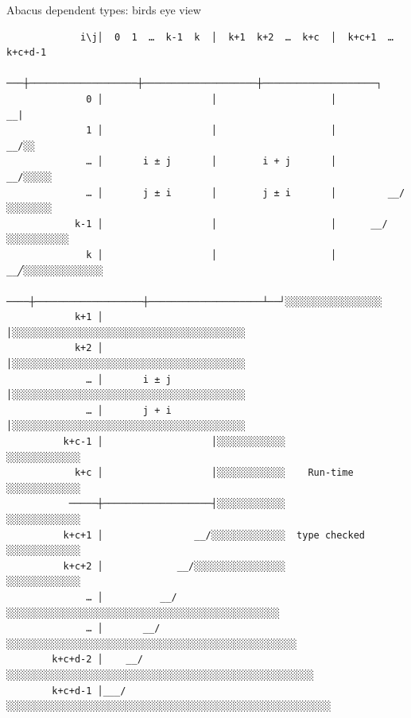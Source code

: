 \documentclass{beamer}
\begin{document}
    \begin{frame}[fragile]{Abacus dependent types: birds eye view}
        \begin{tiny}
        \begin{verbatim}
             i\j│  0  1  …  k-1  k  │  k+1  k+2  …  k+c  │  k+c+1  …  k+c+d-1
             ───┼───────────────────┼────────────────────┼────────────────────┐
              0 │                   │                    │                  __|
              1 │                   │                    │               __/░░
              … │       i ± j       │        i + j       │            __/░░░░░
              … │       j ± i       │        j ± i       │         __/░░░░░░░░
            k-1 │                   │                    │      __/░░░░░░░░░░░
              k │                   │                    │   __╱░░░░░░░░░░░░░░
            ────┼───────────────────┼────────────────────┴──┘░░░░░░░░░░░░░░░░░
            k+1 │                   │░░░░░░░░░░░░░░░░░░░░░░░░░░░░░░░░░░░░░░░░░
            k+2 │                   │░░░░░░░░░░░░░░░░░░░░░░░░░░░░░░░░░░░░░░░░░
              … │       i ± j       │░░░░░░░░░░░░░░░░░░░░░░░░░░░░░░░░░░░░░░░░░
              … │       j + i       │░░░░░░░░░░░░░░░░░░░░░░░░░░░░░░░░░░░░░░░░░
          k+c-1 │                   │░░░░░░░░░░░░                ░░░░░░░░░░░░░
            k+c │                   │░░░░░░░░░░░░    Run-time    ░░░░░░░░░░░░░
           ─────┼───────────────────┤░░░░░░░░░░░░                ░░░░░░░░░░░░░
          k+c+1 │                __/░░░░░░░░░░░░░  type checked  ░░░░░░░░░░░░░
          k+c+2 │             __/░░░░░░░░░░░░░░░░                ░░░░░░░░░░░░░
              … │          __/░░░░░░░░░░░░░░░░░░░░░░░░░░░░░░░░░░░░░░░░░░░░░░░░
              … │       __/░░░░░░░░░░░░░░░░░░░░░░░░░░░░░░░░░░░░░░░░░░░░░░░░░░░
        k+c+d-2 │    __/░░░░░░░░░░░░░░░░░░░░░░░░░░░░░░░░░░░░░░░░░░░░░░░░░░░░░░
        k+c+d-1 │___/░░░░░░░░░░░░░░░░░░░░░░░░░░░░░░░░░░░░░░░░░░░░░░░░░░░░░░░░░
        \end{verbatim}
        \end{tiny}
    \end{frame}
\end{document}
